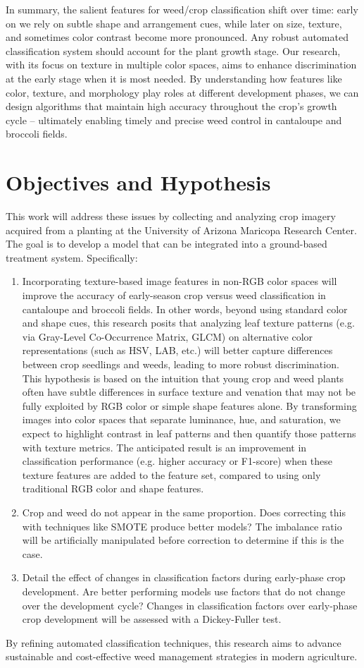 \documentclass[letterpaper]{report}
\begin{document}
In summary, the salient features for weed/crop classification shift over time: early on we rely on subtle shape and arrangement cues, while later on size, texture, and sometimes color contrast become more pronounced. Any robust automated classification system should account for the plant growth stage. Our research, with its focus on texture in multiple color spaces, aims to enhance discrimination at the early stage when it is most needed. By understanding how features like color, texture, and morphology play roles at different development phases, we can design algorithms that maintain high accuracy throughout the crop’s growth cycle – ultimately enabling timely and precise weed control in cantaloupe and broccoli fields. 

\section{Objectives and Hypothesis}
This work will address these issues by collecting and analyzing crop imagery acquired from a planting at the University of Arizona Maricopa Research Center. The goal is to develop a model that can be integrated into a ground-based treatment system.  Specifically:
\begin{enumerate}
	\item{Incorporating texture-based image features in non-RGB color spaces will improve the accuracy of early-season crop versus weed classification in cantaloupe and broccoli fields. In other words, beyond using standard color and shape cues, this research posits that analyzing leaf texture patterns (e.g. via Gray-Level Co-Occurrence Matrix, GLCM) on alternative color representations (such as HSV, LAB, etc.) will better capture differences between crop seedlings and weeds, leading to more robust discrimination. This hypothesis is based on the intuition that young crop and weed plants often have subtle differences in surface texture and venation that may not be fully exploited by RGB color or simple shape features alone. By transforming images into color spaces that separate luminance, hue, and saturation, we expect to highlight contrast in leaf patterns and then quantify those patterns with texture metrics. The anticipated result is an improvement in classification performance (e.g. higher accuracy or F1-score) when these texture features are added to the feature set, compared to using only traditional RGB color and shape features.}
	\item{Crop and weed do not appear in the same proportion. Does correcting this with techniques like SMOTE produce better models? The imbalance ratio will be artificially manipulated before correction to determine if this is the case.}
	\item{Detail the effect of changes in classification factors during early-phase crop development. Are better performing models use factors that do not change over the development cycle? Changes in classification factors over early-phase crop development will be assessed with a Dickey-Fuller test.}
\end{enumerate}
By refining automated classification techniques, this research aims to advance sustainable and cost-effective weed management strategies in modern agriculture.
\end{document}
